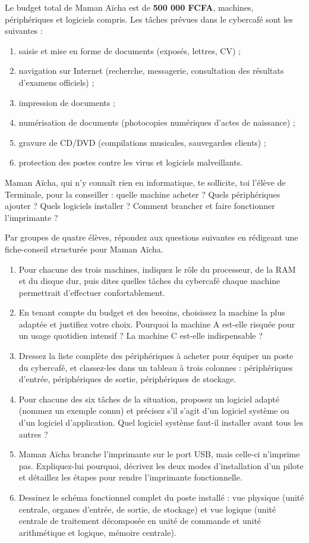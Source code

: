 \documentclass[11pt]{article}
\newcounter{popsec}
\newcounter{popsub}
\newcommand{\courssub}[1]{%
  \stepcounter{popsub}%
  \par\vspace{9pt}\noindent{\popxbold\fontsize{11.5}{13}\selectfont\color{popink}{\color{poporange}\thepopsec.\thepopsub}\hspace{6pt}#1}\par\nopagebreak\vspace{4pt}
}
\begin{document}
Le budget total de Maman Aïcha est de \textbf{500 000 FCFA}, machines, périphériques et logiciels compris. Les tâches prévues dans le cybercafé sont les suivantes :

\begin{enumerate}
\item saisie et mise en forme de documents (exposés, lettres, CV) ;
\item navigation sur Internet (recherche, messagerie, consultation des résultats d'examens officiels) ;
\item impression de documents ;
\item numérisation de documents (photocopies numériques d'actes de naissance) ;
\item gravure de CD/DVD (compilations musicales, sauvegardes clients) ;
\item protection des postes contre les virus et logiciels malveillants.
\end{enumerate}

Maman Aïcha, qui n'y connaît rien en informatique, te sollicite, toi l'élève de Terminale, pour la conseiller : quelle machine acheter ? Quels périphériques ajouter ? Quels logiciels installer ? Comment brancher et faire fonctionner l'imprimante ?

\courssub{Consignes de travail}

Par groupes de quatre élèves, répondez aux questions suivantes en rédigeant une fiche-conseil structurée pour Maman Aïcha.

\begin{enumerate}
\item Pour chacune des trois machines, indiquez le rôle du processeur, de la RAM et du disque dur, puis dites quelles tâches du cybercafé chaque machine permettrait d'effectuer confortablement.
\item En tenant compte du budget et des besoins, choisissez la machine la plus adaptée et justifiez votre choix. Pourquoi la machine A est-elle risquée pour un usage quotidien intensif ? La machine C est-elle indispensable ?
\item Dressez la liste complète des périphériques à acheter pour équiper un poste du cybercafé, et classez-les dans un tableau à trois colonnes : périphériques d'entrée, périphériques de sortie, périphériques de stockage.
\item Pour chacune des six tâches de la situation, proposez un logiciel adapté (nommez un exemple connu) et précisez s'il s'agit d'un logiciel système ou d'un logiciel d'application. Quel logiciel système faut-il installer avant tous les autres ?
\item Maman Aïcha branche l'imprimante sur le port USB, mais celle-ci n'imprime pas. Expliquez-lui pourquoi, décrivez les deux modes d'installation d'un pilote et détaillez les étapes pour rendre l'imprimante fonctionnelle.
\item Dessinez le schéma fonctionnel complet du poste installé : vue physique (unité centrale, organes d'entrée, de sortie, de stockage) et vue logique (unité centrale de traitement décomposée en unité de commande et unité arithmétique et logique, mémoire centrale).
\end{enumerate}
\end{document}

